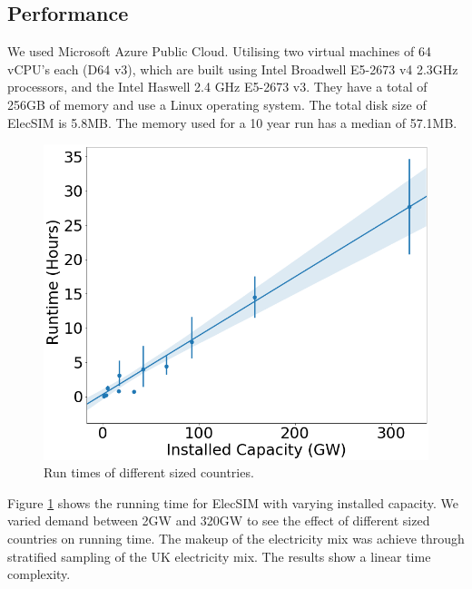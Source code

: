 \subsection{Performance}

 We used Microsoft Azure Public Cloud. Utilising two virtual machines of 64 vCPU's each (D64 v3), which are built using Intel Broadwell E5-2673 v4 2.3GHz processors, and the Intel Haswell 2.4 GHz E5-2673 v3. They have a total of 256GB of memory and use a Linux operating system. The total disk size of ElecSIM is 5.8MB. The memory used for a 10 year run has a median of 57.1MB.


\begin{figure}
	\centering
	\includegraphics[width=0.7\linewidth]{figures/timing_plot_smaller.png}
	\caption{Run times of different sized countries.}
	\label{fig:timingplot}
	\vskip -0.5cm
\end{figure}


Figure \ref{fig:timingplot} shows the running time for ElecSIM with varying installed capacity. We varied demand between 2GW and 320GW to see the effect of different sized countries on running time. The makeup of the electricity mix was achieve through stratified sampling of the UK electricity mix. The results show a linear time complexity. 


